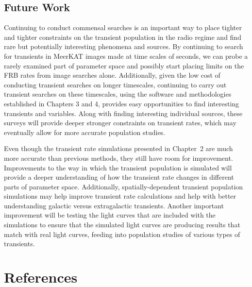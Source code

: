 \documentclass[12pt]{article}
\begin{document}
\subsection{Future Work}


Continuing to conduct commensal searches is an important way to place tighter and tighter constraints on the transient population in the radio regime and find rare but potentially interesting phenomena and sources. By continuing to search for transients in MeerKAT images made at time scales of seconds, we can probe a rarely examined part of parameter space and possibly start placing limits on the FRB rates from image searches alone. Additionally, given the low cost of conducting transient searches on longer timescales, continuing to carry out transient searches on these timescales, using the software and methodologies established in Chapters 3 and 4, provides easy opportunities to find interesting transients and variables. Along with finding interesting individual sources, these surveys will provide deeper stronger constraints on transient rates, which may eventually allow for more accurate population studies.

Even though the transient rate simulations presented in Chapter~2 are much more accurate than previous methods, they still have room for improvement. Improvements to the way in which the transient population is simulated will provide a deeper understanding of how the transient rate changes in different parts of parameter space. Additionally, spatially-dependent transient population simulations may help improve transient rate calculations and help with better understanding galactic versus extragalactic transients. Another important improvement will be testing the light curves that are included with the simulations to ensure that the simulated light curves are producing results that match with real light curves, feeding into population studies of various types of transients.

\newpage
\section{References}
{\def\section*#1{}
\singlespacing


}
\newpage
{}
\end{document}
